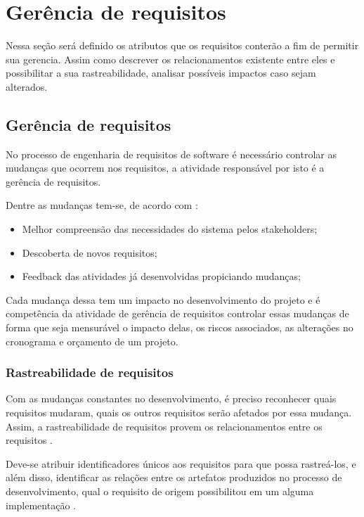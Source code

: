 \chapter[Gerência de requisitos]{Gerência de requisitos}

Nessa seção será definido os atributos que os requisitos conterão a fim de permitir sua gerencia. Assim como descrever os relacionamentos existente entre eles e possibilitar a sua rastreabilidade, analisar possíveis impactos  caso sejam alterados.
\section{Gerência de requisitos}

No processo de engenharia de requisitos de software é necessário controlar as mudanças que ocorrem nos requisitos, a atividade responsável por isto é a gerência de requisitos.

Dentre as mudanças tem-se, de acordo com \cite{silva2011}:
\begin{itemize}
    \item Melhor compreensão das necessidades do sistema pelos stakeholders;
    \item Descoberta de novos requisitos;
    \item Feedback das atividades já desenvolvidas propiciando mudanças;
\end{itemize}

Cada mudança dessa tem um impacto no desenvolvimento do projeto e é competência da atividade de gerência de requisitos controlar essas mudanças de forma que seja mensurável o impacto delas, os riscos associados, as alterações no cronograma e orçamento de um projeto.\cite{silva2011}

\subsection{Rastreabilidade de requisitos}

Com as mudanças constantes no desenvolvimento, é preciso reconhecer quais requisitos mudaram, quais os outros requisitos serão afetados por essa mudança. Assim, a rastreabilidade de requisitos provem os relacionamentos entre os requisitos \cite{leite2005}.

Deve-se atribuir identificadores únicos aos requisitos para que possa rastreá-los, e além disso, identificar as relações entre os artefatos produzidos no processo de desenvolvimento, qual o requisito de origem possibilitou em um alguma implementação \cite{silva2011}.

